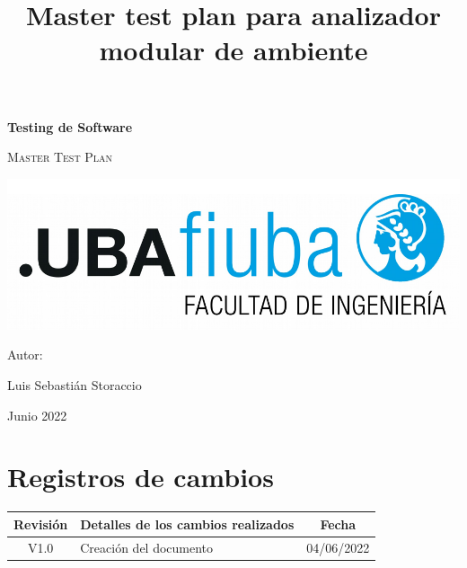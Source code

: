 \documentclass[11pt]{article}
\date{}
\title{Master test plan para analizador modular de ambiente}
\begin{document}
\begin{titlepage}
    \centering
    {\bfseries\LARGE Testing de Software \par}

    \vspace{3cm}
    {\scshape\Huge Master Test Plan \par}
    \vspace{3cm}
    \includegraphics[scale=0.8]{Figuras/logoFIUBA.pdf}
    \vfill
    {\Large Autor: \par}
    {\Large Luis Sebastián Storaccio \par}
    \vfill
    {\Large Junio 2022 \par}
\end{titlepage}

\thispagestyle{empty}
{\setlength{\parskip}{0pt}
    \tableofcontents{}
}
\pagebreak

\section*{Registros de cambios}
\label{sec:registro}
\vspace{5cm}
\begin{table}[!ht]
    \label{tab:registro}
    \centering

    \begin{tabularx}{\linewidth}{@{}|c|X|c|@{}}
        \hline
        \rowcolor[HTML]{d6c6c3}
        \bf Revisión & \multicolumn{1}{c|}{\bf Detalles de los cambios
        realizados}  &
        \bf Fecha
        \\ \hline
        V1.0         & Creación del documento
                     & 04/06/2022
        \\
        \hline
    \end{tabularx}
\end{table}

\pagebreak
\end{document}
